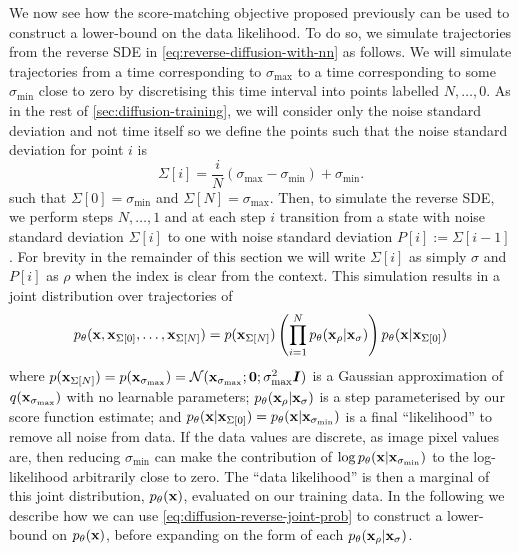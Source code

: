 We now see how the score-matching objective proposed previously can be used to construct a lower-bound on the data likelihood. To do so, we simulate trajectories from the reverse SDE in \cref{eq:reverse-diffusion-with-nn} as follows. We will simulate trajectories from a time corresponding to $\sigma_\text{max}$ to a time corresponding to some $\sigma_\text{min}$ close to zero by discretising this time interval into points labelled $N,\ldots,0$. As in the rest of \cref{sec:diffusion-training}, we will consider only the noise standard deviation and not time itself so we define the points such that the noise standard deviation for point $i$ is
\begin{equation}
    \Sigma[i] = \frac{i}{N}(\sigma_\text{max} - \sigma_\text{min}) + \sigma_\text{min}.
\end{equation}
such that $\Sigma[0] = \sigma_\text{min}$ and $\Sigma[N] = \sigma_\text{max}$. Then, to simulate the reverse SDE, we perform steps $N,\ldots,1$ and at each step $i$ transition from a state with noise standard deviation $\Sigma[i]$ to one with noise standard deviation $P[i] := \Sigma[i-1]$. For brevity in the remainder of this section we will write $\Sigma[i]$ as simply $\sigma$ and $P[i]$ as $\rho$ when the index is clear from the context. This simulation results in a joint distribution over trajectories of
\begin{align} \label{eq:diffusion-reverse-joint-prob}
    p_\theta({\mathbf{x}},{\mathbf{x}}_{\Sigma[0]},\ldots,{\mathbf{x}}_{\Sigma[N]}) = p({\mathbf{x}}_{\Sigma[N]}) \left( \prod_{i=1}^N p_\theta({\mathbf{x}}_{\rho} | {\mathbf{x}}_{\sigma}) \right) p_\theta({\mathbf{x}}|{\mathbf{x}}_{\Sigma[0]})
\end{align}
where $p({\mathbf{x}}_{\Sigma[N]}) = p({\mathbf{x}}_{\sigma_\text{max}}) = {\mathcal{N}}({\mathbf{x}}_{\sigma_\text{max}}; \mathbf{0}; \sigma_\text{max}^2{\bm{I}})$ is a Gaussian approximation of $q({\mathbf{x}}_{\sigma_\text{max}})$ with no learnable parameters; $p_\theta({\mathbf{x}}_{\rho} | {\mathbf{x}}_{\sigma})$ is a step parameterised by our score function estimate; and $p_\theta({\mathbf{x}}|{\mathbf{x}}_{\Sigma[0]}) = p_\theta({\mathbf{x}}|{\mathbf{x}}_{\sigma_\text{min}})$ is a final ``likelihood'' to remove all noise from data. If the data values are discrete, as image pixel values are, then reducing $\sigma_\text{min}$ can make the contribution of $\log p_\theta({\mathbf{x}}|{\mathbf{x}}_{\sigma_\text{min}})$ to the log-likelihood arbitrarily close to zero. The ``data likelihood'' is then a marginal of this joint distribution, $p_\theta({\mathbf{x}})$, evaluated on our training data. In the following we describe how we can use \cref{eq:diffusion-reverse-joint-prob} to construct a lower-bound on $p_\theta({\mathbf{x}})$, before expanding on the form of each $p_\theta({\mathbf{x}}_{\rho}|{\mathbf{x}}_{\sigma})$.

